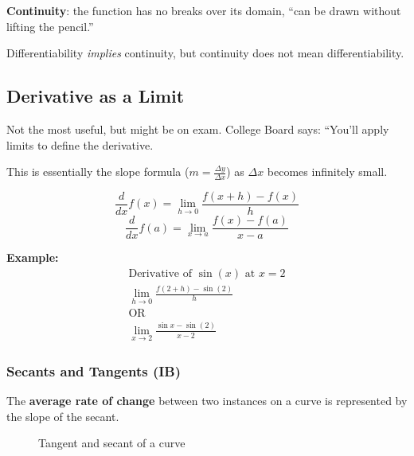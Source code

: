 \documentclass[12pt]{article}
\begin{document}
\noindent \textbf{Continuity}: the function has no breaks over its domain, ``can be drawn without lifting the pencil.''

\noindent Differentiability \textit{implies} continuity, but continuity does not mean differentiability.

\subsection{Derivative as a Limit}
Not the most useful, but might be on exam. College Board says: ``You'll apply limits to define the derivative.

\noindent This is essentially the slope formula ($m = \frac{\Delta y}{\Delta x}$) as $\Delta x$ becomes infinitely small.

\[ \frac{d}{dx} f(x) = \lim_{h \to 0} \frac{f(x+h) - f(x)}{h} \]
\[ \frac{d}{dx} f(a) = \lim_{x \to a} \frac{f(x) - f(a)}{x-a} \]

\noindent \textbf{Example:}
\begin{gather*}
    \text{Derivative of $\sin(x)$ at $x=2$} \\
    \lim_{h \to 0} \frac{f(2+h) - \sin{(2)}}{h} \\
    \text{OR} \\
    \lim_{x \to 2} \frac{\sin{x} - \sin{(2)}}{x-2}
\end{gather*}

\subsubsection{Secants and Tangents (IB)}

The \textbf{average rate of change} between two instances on a curve is represented by the slope of the secant.

\begin{figure}[H]
    \begin{center}
        \caption{Tangent and secant of a curve}
        \label{fig:tangent-secant}
    \end{center}
\end{figure}
\end{document}
